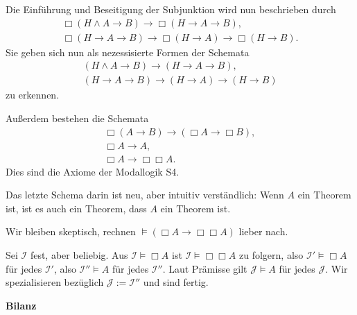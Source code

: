 \documentclass[9pt,fleqn,aspectratio=169]{beamer}
\newcommand{\strong}[1]{\textbf{#1}}
\newcommand{\parspace}{\vspace{0.8em}}
\newcommand{\headline}[1]{\begin{center}\strong{#1}\end{center}}
\newcommand{\lnec}{\Box}
\begin{document}
\begin{frame}
Die Einführung und Beseitigung der Subjunktion wird
nun beschrieben durch
\begin{gather*}
\lnec (H\land A\to B) \to \lnec (H\to A\to B),\\
\lnec (H\to A\to B) \to \lnec(H\to A) \to \lnec(H\to B).
\end{gather*}\pause
Sie geben sich nun als nezessisierte Formen der Schemata
\begin{gather*}
(H\land A\to B) \to (H\to A\to B),\\
(H\to A\to B) \to (H\to A) \to (H\to B)
\end{gather*}
zu erkennen.
\end{frame}

\begin{frame}
Außerdem bestehen die Schemata
\begin{gather*}
\lnec (A\to B) \to (\lnec A \to \lnec B),\\
\lnec A \to A,\\
\lnec A \to \lnec\lnec A.
\end{gather*}\pause
Dies sind die Axiome der Modallogik S4.
\end{frame}

\begin{frame}
Das letzte Schema darin ist neu, aber intuitiv verständlich: Wenn $A$ ein
Theorem ist, ist es auch ein Theorem, dass $A$ ein Theorem ist.\pause

\parspace
Wir bleiben skeptisch, rechnen $\models (\lnec A\to \lnec\lnec A)$ lieber nach.\pause

\parspace
Sei $\mathcal I$ fest, aber beliebig. Aus $\mathcal I\models\lnec A$
ist $\mathcal I\models\lnec\lnec A$ zu folgern, also $\mathcal I'\models\lnec A$
für jedes $\mathcal I'$, also $\mathcal I''\models A$ für jedes $\mathcal I''$.
Laut Prämisse gilt $\mathcal J\models A$ für jedes $\mathcal J$. Wir
spezialisieren bezüglich $\mathcal J := \mathcal I''$ und sind fertig.
\end{frame}

\begin{frame}
\headline{Bilanz}
\end{frame}
\end{document}
